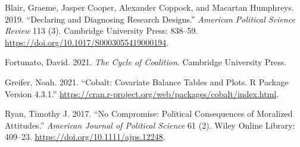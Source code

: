 \documentclass[]{article}
\begin{document}
\leavevmode\hypertarget{ref-blair2019declaring}{}%
Blair, Graeme, Jasper Cooper, Alexander Coppock, and Macartan Humphreys.
2019. ``Declaring and Diagnosing Research Designs.'' \emph{American
Political Science Review} 113 (3). Cambridge University Press: 838--59.
\url{https://doi.org/10.1017/S0003055419000194}.

\leavevmode\hypertarget{ref-fortunato2021cycle}{}%
Fortunato, David. 2021. \emph{The Cycle of Coalition}. Cambridge
University Press.

\leavevmode\hypertarget{ref-greifer2021}{}%
Greifer, Noah. 2021. ``Cobalt: Covariate Balance Tables and Plots. R
Package Version 4.3.1.''
\url{https://cran.r-project.org/web/packages/cobalt/index.html}.

\leavevmode\hypertarget{ref-ryan2017no}{}%
Ryan, Timothy J. 2017. ``No Compromise: Political Consequences of
Moralized Attitudes.'' \emph{American Journal of Political Science} 61
(2). Wiley Online Library: 409--23.
\url{https://doi.org/10.1111/ajps.12248}.
\end{document}
